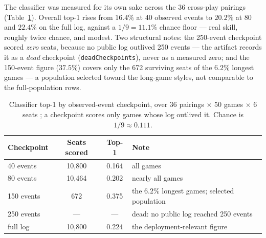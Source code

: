\documentclass[11pt]{article}
\newcommand{\code}[1]{\texttt{#1}}
\begin{document}
The classifier was measured for its own sake across the 36 cross-play pairings
(Table~\ref{tab:clscurve}). Overall top-1 rises from $16.4\%$ at 40 observed events to
$20.2\%$ at 80 and $22.4\%$ on the full log, against a $1/9 = 11.1\%$ chance floor ---
real skill, roughly twice chance, and modest. Two structural notes: the 250-event
checkpoint scored \emph{zero} seats, because no public log outlived 250 events --- the
artifact records it as a \emph{dead} checkpoint (\code{deadCheckpoints}), never as a
measured zero; and the 150-event figure ($37.5\%$) covers only the 672 surviving seats of
the $6.2\%$ longest games --- a population selected toward the long-game styles, not
comparable to the full-population rows.

\begin{table}[t]
\centering
\caption{Classifier top-1 by observed-event checkpoint, over 36 pairings $\times$ 50
games $\times$ 6 seats \cite{artifact}; a checkpoint scores only games whose log outlived
it. Chance is $1/9 \approx 0.111$.}
\label{tab:clscurve}
\footnotesize
\begin{tabular}{@{}lccl@{}}
\toprule
Checkpoint & Seats scored & Top-1 & Note \\
\midrule
40 events  & 10{,}800 & 0.164 & all games \\
80 events  & 10{,}464 & 0.202 & nearly all games \\
150 events & 672      & 0.375 & the $6.2\%$ longest games; selected population \\
250 events & ---      & ---   & dead: no public log reached 250 events \\
full log   & 10{,}800 & 0.224 & the deployment-relevant figure \\
\bottomrule
\end{tabular}
\end{table}
\end{document}
